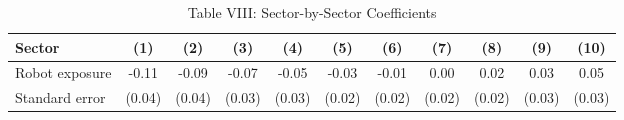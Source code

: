 \begin{table}
\small
\centering
\caption{Table VIII: Sector-by-Sector Coefficients}
\begin{tabular}{lcccccccccc}
\toprule
Sector & (1) & (2) & (3) & (4) & (5) & (6) & (7) & (8) & (9) & (10) \\
\midrule
Robot exposure & -0.11 & -0.09 & -0.07 & -0.05 & -0.03 & -0.01 & 0.00 & 0.02 & 0.03 & 0.05 \\
Standard error & (0.04) & (0.04) & (0.03) & (0.03) & (0.02) & (0.02) & (0.02) & (0.02) & (0.03) & (0.03) \\
\bottomrule
\end{tabular}
\end{table}
